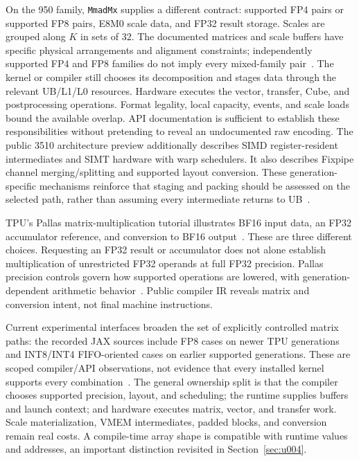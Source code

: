 On the 950 family, \texttt{MmadMx} supplies a different contract: supported FP4 pairs or supported FP8 pairs, E8M0 scale data, and FP32 result storage. Scales are grouped along $K$ in sets of 32. The documented matrices and scale buffers have specific physical arrangements and alignment constraints; independently supported FP4 and FP8 families do not imply every mixed-family pair~\citep{u003_ascend_mmadmx}. The kernel or compiler still chooses its decomposition and stages data through the relevant UB/L1/L0 resources. Hardware executes the vector, transfer, Cube, and postprocessing operations. Format legality, local capacity, events, and scale loads bound the available overlap. API documentation is sufficient to establish these responsibilities without pretending to reveal an undocumented raw encoding. The public 3510 architecture preview additionally describes SIMD register-resident intermediates and SIMT hardware with warp schedulers. It also describes Fixpipe channel merging/splitting and supported layout conversion. These generation-specific mechanisms reinforce that staging and packing should be assessed on the selected path, rather than assuming every intermediate returns to UB~\citep{u003_ascend_3510}.

TPU's Pallas matrix-multiplication tutorial illustrates BF16 input data, an FP32 accumulator reference, and conversion to BF16 output~\citep{u003_pallas_matmul}. These are three different choices. Requesting an FP32 result or accumulator does not alone establish multiplication of unrestricted FP32 operands at full FP32 precision. Pallas precision controls govern how supported operations are lowered, with generation-dependent arithmetic behavior~\citep{u003_pallas_details}. Public compiler IR reveals matrix and conversion intent, not final machine instructions.

Current experimental interfaces broaden the set of explicitly controlled matrix paths: the recorded JAX sources include FP8 cases on newer TPU generations and INT8/INT4 FIFO-oriented cases on earlier supported generations. These are scoped compiler/API observations, not evidence that every installed kernel supports every combination~\citep{u003_jax_explicit}. The general ownership split is that the compiler chooses supported precision, layout, and scheduling; the runtime supplies buffers and launch context; and hardware executes matrix, vector, and transfer work. Scale materialization, VMEM intermediates, padded blocks, and conversion remain real costs. A compile-time array shape is compatible with runtime values and addresses, an important distinction revisited in Section~\ref{sec:u004}.


